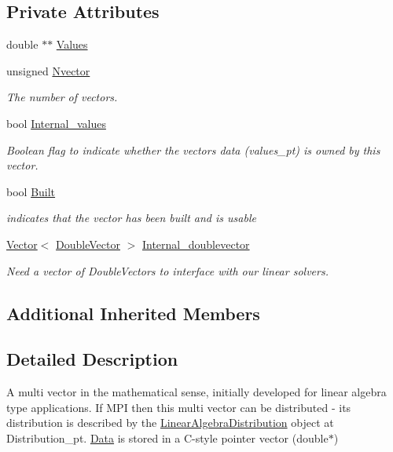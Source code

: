 \subsection*{Private Attributes}
\begin{DoxyCompactItemize}
\item 
double $\ast$$\ast$ \hyperlink{classoomph_1_1DoubleMultiVector_a562d13abfae53ad5b3e3c6020b4da0e5}{Values}
\item 
unsigned \hyperlink{classoomph_1_1DoubleMultiVector_a21446924694c708c6a82cc908bf7846a}{Nvector}
\begin{DoxyCompactList}\small\item\em The number of vectors. \end{DoxyCompactList}\item 
bool \hyperlink{classoomph_1_1DoubleMultiVector_adf8fe4053c07e949f8e9cbea9e29e6e6}{Internal\+\_\+values}
\begin{DoxyCompactList}\small\item\em Boolean flag to indicate whether the vector\textquotesingle{}s data (values\+\_\+pt) is owned by this vector. \end{DoxyCompactList}\item 
bool \hyperlink{classoomph_1_1DoubleMultiVector_a86924834b6045e4824a6088e97e35cc8}{Built}
\begin{DoxyCompactList}\small\item\em indicates that the vector has been built and is usable \end{DoxyCompactList}\item 
\hyperlink{classoomph_1_1Vector}{Vector}$<$ \hyperlink{classoomph_1_1DoubleVector}{Double\+Vector} $>$ \hyperlink{classoomph_1_1DoubleMultiVector_a668c57e389403b0d0c8bafdfa3f66b82}{Internal\+\_\+doublevector}
\begin{DoxyCompactList}\small\item\em Need a vector of Double\+Vectors to interface with our linear solvers. \end{DoxyCompactList}\end{DoxyCompactItemize}
\subsection*{Additional Inherited Members}


\subsection{Detailed Description}
A multi vector in the mathematical sense, initially developed for linear algebra type applications. If M\+PI then this multi vector can be distributed -\/ its distribution is described by the \hyperlink{classoomph_1_1LinearAlgebraDistribution}{Linear\+Algebra\+Distribution} object at Distribution\+\_\+pt. \hyperlink{classoomph_1_1Data}{Data} is stored in a C-\/style pointer vector (double$\ast$) 

